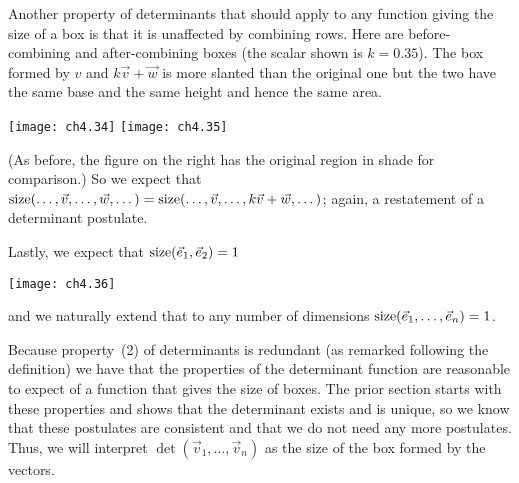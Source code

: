 Another property of determinants that should apply to any 
function giving the size of a box is that
it is unaffected by combining rows.
Here are before-combining and 
after-combining boxes (the scalar shown is $k=0.35$). 
The box formed by $v$ and 
$k\vec{v}+\vec{w}$ is
more slanted than the original one but the two have the
same base and the same height and hence the same area.
\begin{center}
  \texttt{[image: ch4.34]}
  \qquad
  \texttt{[image: ch4.35]}
\end{center}   
(As before, the figure on the right has the 
original region in shade for comparison.)
So we expect that  
$\operatorname{size} (\dots,\vec{v},\dots,\vec{w},\dots)
=\operatorname{size} (\dots,\vec{v},\dots,k\vec{v}+\vec{w},\dots)$;
again, a restatement of a determinant postulate.

Lastly, we expect that \( \operatorname{size} (\vec{e}_1,\vec{e}_2)=1 \)
\begin{center}
  \texttt{[image: ch4.36]}
\end{center}
and we naturally extend that to any number of dimensions
$\operatorname{size}(\vec{e}_1,\dots,\vec{e}_n)=1$.

Because property~(2) of determinants is 
redundant (as remarked following the definition) 
we have that the properties of the determinant function are reasonable
to expect of a function that gives the size of boxes.
The prior section starts with these properties and shows
that the determinant exists and is unique, so we know  
that these postulates are consistent and 
that we do not need any more postulates.
Thus, we will
interpret \( \det(\vec{v}_1,\dots,\vec{v}_n) \) as the
size of the box formed by the vectors.

